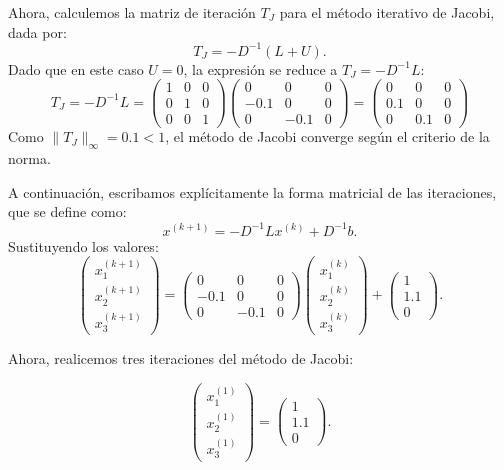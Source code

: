 \begin{homeworkProblem}
\begin{enumerate}
\begin{solucion}
Ahora, calculemos la matriz de iteración $ T_J $ para el método iterativo de Jacobi, dada por:
\[
T_J = -D^{-1}(L+U).
\]
Dado que en este caso $ U = 0 $, la expresión se reduce a $ T_J = -D^{-1} L $:
\[
T_J = -D^{-1} L =
\begin{pmatrix}
        1 & 0 & 0\\
        0 & 1 & 0\\
        0 & 0 & 1
\end{pmatrix}
\begin{pmatrix}
            0 & 0 & 0\\
            -0.1 & 0 & 0\\
            0 & -0.1 & 0
\end{pmatrix}
=
\begin{pmatrix}
            0 & 0 & 0\\
            0.1 & 0 & 0\\
            0 & 0.1 & 0
\end{pmatrix}
\]
Como $ \|T_J\|_\infty = 0.1 < 1 $, el método de Jacobi converge según el criterio de la norma.

A continuación, escribamos explícitamente la forma matricial de las iteraciones, que se define como:
\[
x^{(k+1)} = -D^{-1} L x^{(k)} + D^{-1} b.
\]
Sustituyendo los valores:
\[
\begin{pmatrix}
            x_1^{(k+1)} \\
            x_2^{(k+1)} \\
            x_3^{(k+1)}
\end{pmatrix}
=
\begin{pmatrix}
            0 & 0 & 0\\
            -0.1 & 0 & 0\\
            0 & -0.1 & 0
\end{pmatrix}
\begin{pmatrix}
            x_1^{(k)} \\
            x_2^{(k)} \\
            x_3^{(k)}
\end{pmatrix}
+
\begin{pmatrix}
            1 \\
            1.1 \\
            0
\end{pmatrix}.
\]

Ahora, realicemos tres iteraciones del método de Jacobi:

\[
\begin{pmatrix}
            x_1^{(1)} \\
            x_2^{(1)} \\
            x_3^{(1)}
\end{pmatrix}
=
\begin{pmatrix}
            1 \\
            1.1 \\
            0
\end{pmatrix}.
\]


\end{solucion}
\end{enumerate}
\end{homeworkProblem}
